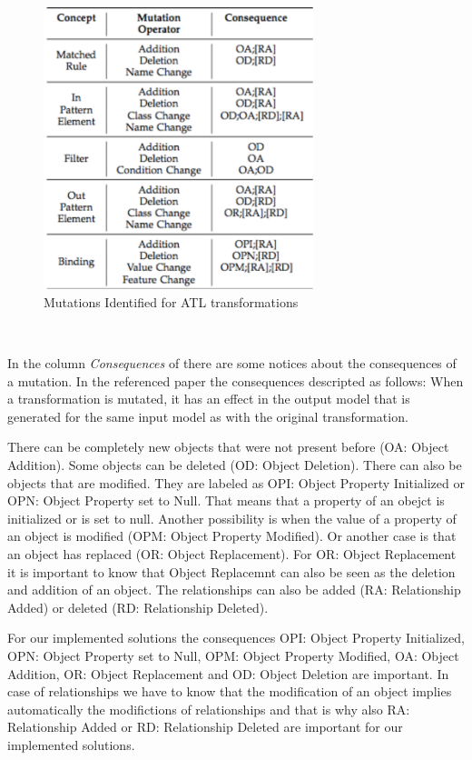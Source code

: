 \documentclass{llncs}
\begin{document}
 \begin{figure}[tb]
	\centering
	\includegraphics[width=0.7\textwidth,natwidth=610,natheight=642]{figures/Mutations_Identified_for_ATL.pdf}
	\caption{Mutations Identified for ATL transformations}
	\label{fig:mutations_ATL}
\end{figure}~\cite{troya:2015}

In the column \textit{Consequences} of
\label{fig:mutations_ATL} there are some notices about the
consequences of a mutation. In the referenced paper \cite{troya:2015} the
consequences descripted as follows: When a transformation is mutated, it has an effect in the output model that is generated for the same input model as with the original transformation. 

There can be completely new objects that were not present before (OA: Object Addition). Some objects can be deleted (OD: Object Deletion). There can also be
objects that are modified. They are labeled as OPI: Object Property
Initialized or OPN: Object Property set to Null. That means that a property of
an obejct is initialized or is set to null. Another possibility is when the
value of a property of an object is modified (OPM:
Object Property Modified). Or another case is
that an object has replaced (OR: Object Replacement). For OR: Object
Replacement it is important to know that Object Replacemnt can also be seen as
the deletion and addition of an object. The relationships can also be added (RA:
Relationship Added) or deleted (RD: Relationship Deleted).\cite{troya:2015}

For our implemented solutions the consequences OPI: Object Property
Initialized, OPN: Object Property set to Null, OPM:
Object Property Modified, OA: Object
Addition, OR: Object Replacement and OD: Object Deletion are important. In case
of relationships we have to know that the modification of an object implies
automatically the modifictions of relationships and that is why also RA:
Relationship Added or RD: Relationship Deleted are important for our implemented
solutions.
\end{document}
